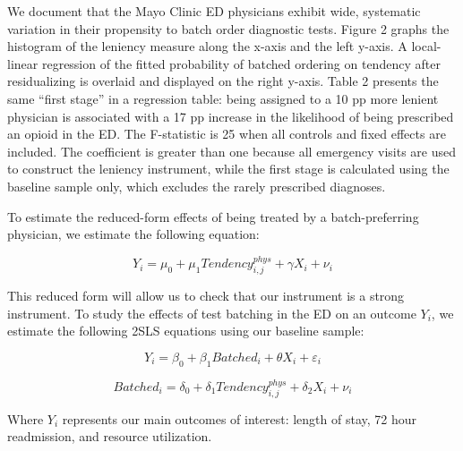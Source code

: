 \documentclass[,,nonblindrev]{informs}
\begin{document}
We document that the Mayo Clinic ED physicians exhibit wide, systematic
variation in their propensity to batch order diagnostic tests. Figure 2
graphs the histogram of the leniency measure along the x-axis and the
left y-axis. A local-linear regression of the fitted probability of
batched ordering on tendency after residualizing is overlaid and
displayed on the right y-axis. Table 2 presents the same ``first stage''
in a regression table: being assigned to a 10 pp more lenient physician
is associated with a 17 pp increase in the likelihood of being
prescribed an opioid in the ED. The F-statistic is 25 when all controls
and fixed effects are included. The coefficient is greater than one
because all emergency visits are used to construct the leniency
instrument, while the first stage is calculated using the baseline
sample only, which excludes the rarely prescribed diagnoses.

To estimate the reduced-form effects of being treated by a
batch-preferring physician, we estimate the following equation:

\begin{equation}
Y_i = \mu_0 + \mu_1 Tendency_{i,j}^{phys} + \gamma X_i + \nu_i
\end{equation}

This reduced form will allow us to check that our instrument is a strong
instrument. To study the effects of test batching in the ED on an
outcome \(Y_i\), we estimate the following 2SLS equations using our
baseline sample:

\begin{equation}
Y_i = \beta_0 + \beta_1 Batched_i + \theta X_i + \varepsilon_i
\end{equation}

\begin{equation}
Batched_i = \delta_0 + \delta_1 Tendency_{i,j}^{phys} + \delta_2 X_i + \nu_i
\end{equation}

Where \(Y_i\) represents our main outcomes of interest: length of stay,
72 hour readmission, and resource utilization.
\end{document}
